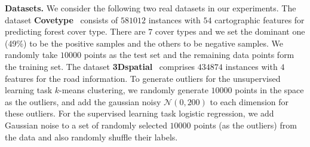 \documentclass{article}
\begin{document}
\textbf{Datasets.} 
We consider the following two real datasets in our experiments. The dataset \textbf{Covetype}~\cite{BLACKARD1999131} consists of $ 581012 $ instances  with $54$ cartographic features for predicting forest cover type. There are $ 7 $ cover types and we set the dominant one (49\%) to be the positive samples and the others to be negative samples. We randomly take $ 10000 $ points as the test set and the remaining data points form the training set. The dataset \textbf{3Dspatial}~\cite{Kaul0J13} comprises $434874$ instances with $ 4 $ features for the road information. To generate outliers for the unsupervised learning task $k$-means clustering, we randomly generate $ 10000 $ points in the space as the outliers, and add the gaussian noisy $ \mathcal{N}(0,200) $ to each dimension for these outliers. For the supervised learning task logistic regression, we add Gaussian noise to a set of randomly selected $10000$ points (as the outliers) from the data and also randomly shuffle their labels.
%

\end{document}
